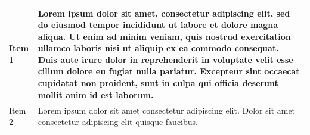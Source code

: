 \begin{table}[H]
    \centering
    \footnotesize
    \begin{tabular}{|p{2cm}|p{12cm}|}
        \hline
        Item 1 & Lorem ipsum dolor sit amet, consectetur adipiscing elit, sed do eiusmod tempor incididunt ut labore et dolore magna aliqua. Ut enim ad minim veniam, quis nostrud exercitation ullamco laboris nisi ut aliquip ex ea commodo consequat. Duis aute irure dolor in reprehenderit in voluptate velit esse cillum dolore eu fugiat nulla pariatur. Excepteur sint occaecat cupidatat non proident, sunt in culpa qui officia deserunt mollit anim id est laborum.\\
        \hline
        Item 2 & Lorem ipsum dolor sit amet consectetur adipiscing elit. Dolor sit amet consectetur adipiscing elit quisque faucibus. \\
        \hline
    \end{tabular}
    
    \label{tab:placeholder}
\end{table}